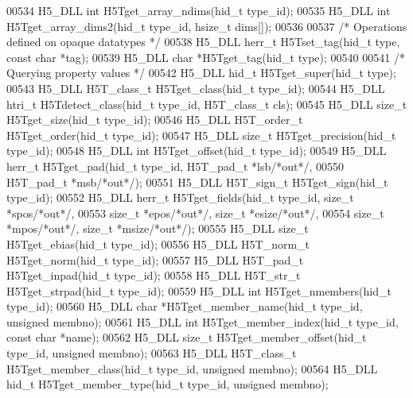 \begin{DoxyCode}
00534 H5\_DLL \textcolor{keywordtype}{int} H5Tget\_array\_ndims(hid\_t type\_id);
00535 H5\_DLL \textcolor{keywordtype}{int} H5Tget\_array\_dims2(hid\_t type\_id, hsize\_t dims[]);
00536 
00537 \textcolor{comment}{/* Operations defined on opaque datatypes */}
00538 H5\_DLL herr\_t H5Tset\_tag(hid\_t type, \textcolor{keyword}{const} \textcolor{keywordtype}{char} *tag);
00539 H5\_DLL \textcolor{keywordtype}{char} *H5Tget\_tag(hid\_t type);
00540 
00541 \textcolor{comment}{/* Querying property values */}
00542 H5\_DLL hid\_t H5Tget\_super(hid\_t type);
00543 H5\_DLL H5T\_class\_t H5Tget\_class(hid\_t type\_id);
00544 H5\_DLL htri\_t H5Tdetect\_class(hid\_t type\_id, H5T\_class\_t cls);
00545 H5\_DLL \textcolor{keywordtype}{size\_t} H5Tget\_size(hid\_t type\_id);
00546 H5\_DLL H5T\_order\_t H5Tget\_order(hid\_t type\_id);
00547 H5\_DLL \textcolor{keywordtype}{size\_t} H5Tget\_precision(hid\_t type\_id);
00548 H5\_DLL \textcolor{keywordtype}{int} H5Tget\_offset(hid\_t type\_id);
00549 H5\_DLL herr\_t H5Tget\_pad(hid\_t type\_id, H5T\_pad\_t *lsb\textcolor{comment}{/*out*/},
00550               H5T\_pad\_t *msb\textcolor{comment}{/*out*/});
00551 H5\_DLL H5T\_sign\_t H5Tget\_sign(hid\_t type\_id);
00552 H5\_DLL herr\_t H5Tget\_fields(hid\_t type\_id, \textcolor{keywordtype}{size\_t} *spos\textcolor{comment}{/*out*/},
00553                  \textcolor{keywordtype}{size\_t} *epos\textcolor{comment}{/*out*/}, \textcolor{keywordtype}{size\_t} *esize\textcolor{comment}{/*out*/},
00554                  \textcolor{keywordtype}{size\_t} *mpos\textcolor{comment}{/*out*/}, \textcolor{keywordtype}{size\_t} *msize\textcolor{comment}{/*out*/});
00555 H5\_DLL \textcolor{keywordtype}{size\_t} H5Tget\_ebias(hid\_t type\_id);
00556 H5\_DLL H5T\_norm\_t H5Tget\_norm(hid\_t type\_id);
00557 H5\_DLL H5T\_pad\_t H5Tget\_inpad(hid\_t type\_id);
00558 H5\_DLL H5T\_str\_t H5Tget\_strpad(hid\_t type\_id);
00559 H5\_DLL \textcolor{keywordtype}{int} H5Tget\_nmembers(hid\_t type\_id);
00560 H5\_DLL \textcolor{keywordtype}{char} *H5Tget\_member\_name(hid\_t type\_id, \textcolor{keywordtype}{unsigned} membno);
00561 H5\_DLL \textcolor{keywordtype}{int} H5Tget\_member\_index(hid\_t type\_id, \textcolor{keyword}{const} \textcolor{keywordtype}{char} *name);
00562 H5\_DLL \textcolor{keywordtype}{size\_t} H5Tget\_member\_offset(hid\_t type\_id, \textcolor{keywordtype}{unsigned} membno);
00563 H5\_DLL H5T\_class\_t H5Tget\_member\_class(hid\_t type\_id, \textcolor{keywordtype}{unsigned} membno);
00564 H5\_DLL hid\_t H5Tget\_member\_type(hid\_t type\_id, \textcolor{keywordtype}{unsigned} membno);

\end{DoxyCode}
